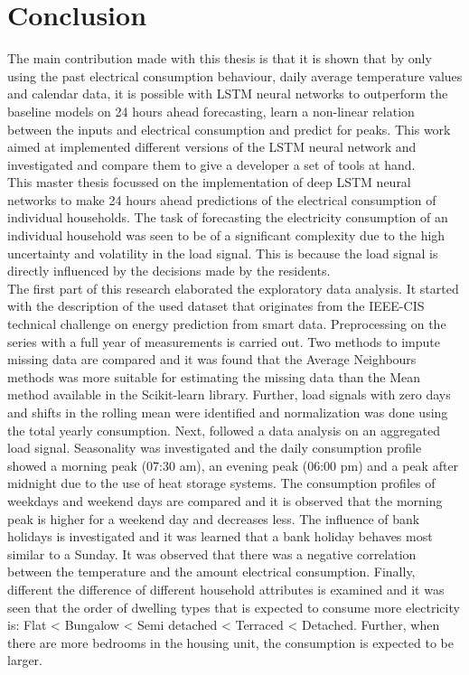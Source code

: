 \chapter{Conclusion}
\label{cha:conclusion}

The main contribution made with this thesis is that it is shown that by only using the past electrical consumption behaviour, daily average temperature values and calendar data, it is possible with LSTM neural networks to outperform the baseline models on 24 hours ahead forecasting, learn a non-linear relation between the inputs and electrical consumption and predict for peaks. This work aimed at implemented different versions of the LSTM neural network and investigated and compare them to give a developer a set of tools at hand.\\

This master thesis focussed on the implementation of deep LSTM neural networks to make 24 hours ahead predictions of the electrical consumption of individual households. The task of forecasting the electricity consumption of an individual household was seen to be of a significant complexity due to the high uncertainty and volatility in the load signal. This is because the load signal is directly influenced by the decisions made by the residents.\\

The first part of this research elaborated the exploratory data analysis. It started with the description of the used dataset that originates from the IEEE-CIS technical challenge on energy prediction from smart data. Preprocessing on the series with a full year of measurements is carried out. Two methods to impute missing data are compared and it was found that the Average Neighbours methods was more suitable for estimating the missing data than the Mean method available in the Scikit-learn library. Further, load signals with zero days and shifts in the rolling mean were identified and normalization was done using the total yearly consumption. Next, followed a data analysis on an aggregated load signal. Seasonality was investigated and the daily consumption profile showed a morning peak (07:30 am), an evening peak (06:00 pm) and a peak after midnight due to the use of heat storage systems. The consumption profiles of weekdays and weekend days are compared and it is observed that the morning peak is higher for a weekend day and decreases less. The influence of bank holidays is investigated and it was learned that a bank holiday behaves most similar to a Sunday. It was observed that there was a negative correlation between the temperature and the amount electrical consumption. Finally, different the difference of different household attributes is examined and it was seen that the order of dwelling types that is expected to consume more electricity is: Flat < Bungalow < Semi detached < Terraced < Detached. Further, when there are more bedrooms in the housing unit, the consumption is expected to be larger. \\ 

